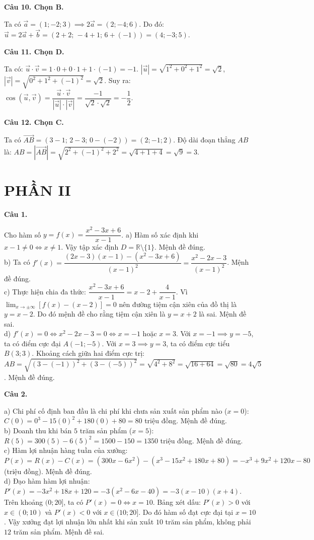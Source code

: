 \documentclass[12pt,a4paper]{article}
\newcommand{\loigiai}[1]{\par\medskip\Needspace{4\baselineskip}\noindent\textbf{#1}\par\nobreak}
\begin{document}
\loigiai{Câu 10. Chọn B.}
Ta có $\vec{a}=(1;-2;3) \implies 2\vec{a}=(2;-4;6)$.
Do đó:
$\vec{u}=2\vec{a}+\vec{b}=(2+2;\,-4+1;\,6+(-1))=(4;-3;5)$.

\loigiai{Câu 11. Chọn D.}
Ta có:
$\vec{u}\cdot\vec{v}=1\cdot 0 + 0\cdot 1 + 1\cdot(-1)=-1$.
$|\vec{u}|=\sqrt{1^2+0^2+1^2}=\sqrt{2}$, $|\vec{v}|=\sqrt{0^2+1^2+(-1)^2}=\sqrt{2}$.
Suy ra:
$\cos(\vec{u},\vec{v})=\dfrac{\vec{u}\cdot\vec{v}}{|\vec{u}|\cdot|\vec{v}|}=\dfrac{-1}{\sqrt{2}\cdot\sqrt{2}}=-\dfrac{1}{2}$.

\loigiai{Câu 12. Chọn C.}
Ta có $\vec{AB}=(3-1;\,2-3;\,0-(-2))=(2;-1;2)$.
Độ dài đoạn thẳng $AB$ là:
$AB=|\vec{AB}|=\sqrt{2^2+(-1)^2+2^2}=\sqrt{4+1+4}=\sqrt{9}=3$.

\section*{PHẦN II}

\loigiai{Câu 1.}
Cho hàm số $y=f(x)=\dfrac{x^2-3x+6}{x-1}$.
a) Hàm số xác định khi $x-1\ne 0 \iff x\ne 1$. Vậy tập xác định $D=\mathbb{R}\setminus\{1\}$. Mệnh đề đúng.\\
b) Ta có $f'(x)=\dfrac{(2x-3)(x-1)-(x^2-3x+6)}{(x-1)^2}=\dfrac{x^2-2x-3}{(x-1)^2}$. Mệnh đề đúng.\\
c) Thực hiện chia đa thức: $\dfrac{x^2-3x+6}{x-1}=x-2+\dfrac{4}{x-1}$. Vì $\lim_{x\to \pm\infty}\left[f(x)-(x-2)\right]=0$ nên đường tiệm cận xiên của đồ thị là $y=x-2$. Do đó mệnh đề cho rằng tiệm cận xiên là $y=x+2$ là sai. Mệnh đề sai.\\
d) $f'(x)=0 \iff x^2-2x-3=0 \iff x=-1$ hoặc $x=3$.
Với $x=-1 \implies y=-5$, ta có điểm cực đại $A(-1;-5)$.
Với $x=3 \implies y=3$, ta có điểm cực tiểu $B(3;3)$.
Khoảng cách giữa hai điểm cực trị:
$AB=\sqrt{(3-(-1))^2+(3-(-5))^2}=\sqrt{4^2+8^2}=\sqrt{16+64}=\sqrt{80}=4\sqrt{5}$. Mệnh đề đúng.

\loigiai{Câu 2.}
a) Chi phí cố định ban đầu là chi phí khi chưa sản xuất sản phẩm nào ($x=0$):
$C(0)=0^3-15(0)^2+180(0)+80=80$ triệu đồng. Mệnh đề đúng.\\
b) Doanh thu khi bán $5$ trăm sản phẩm ($x=5$):
$R(5)=300(5)-6(5)^2=1500-150=1350$ triệu đồng. Mệnh đề đúng.\\
c) Hàm lợi nhuận hàng tuần của xưởng:
$P(x)=R(x)-C(x)=(300x-6x^2)-(x^3-15x^2+180x+80)=-x^3+9x^2+120x-80$ (triệu đồng). Mệnh đề đúng.\\
d) Đạo hàm hàm lợi nhuận: $P'(x)=-3x^2+18x+120=-3(x^2-6x-40)=-3(x-10)(x+4)$.
Trên khoảng $(0;20]$, ta có $P'(x)=0 \iff x=10$.
Bảng xét dấu: $P'(x)>0$ với $x\in(0;10)$ và $P'(x)<0$ với $x\in(10;20]$.
Do đó hàm số đạt cực đại tại $x=10$.
Vậy xưởng đạt lợi nhuận lớn nhất khi sản xuất $10$ trăm sản phẩm, không phải $12$ trăm sản phẩm. Mệnh đề sai.
\end{document}
